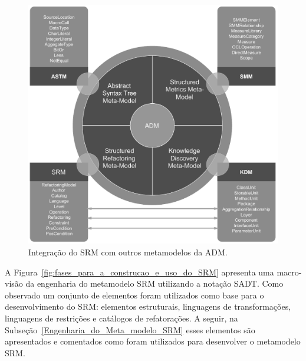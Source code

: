 \begin{figure}[h]
	\centering
	\caption{Integração do SRM com outros metamodelos da ADM.}
	\label{fig:refactoring_metamodel}
	\includegraphics[scale=0.65]{images/SRM2Formatted}
	\fautor
\end{figure}


A Figura~\ref{fig:fases_para_a_construcao_e_uso_do_SRM} apresenta uma macro-visão da engenharia do metamodelo SRM utilizando a notação SADT. Como observado um conjunto de elementos foram utilizados como base para o desenvolvimento do SRM: elementos estruturais, linguagens de transformações, linguagens de restrições e catálogos de refatorações. A seguir, na Subseção~\ref{Engenharia_do_Meta_modelo_SRM} esses elementos são apresentados e comentados como foram utilizados para desenvolver o metamodelo SRM.

